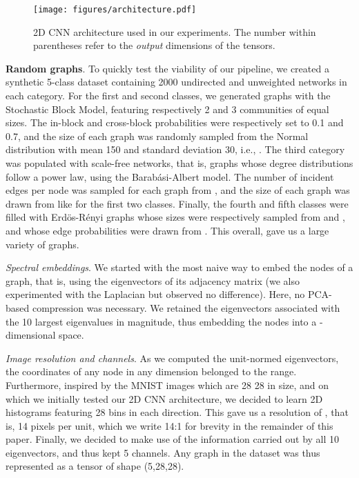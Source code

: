 \documentclass[runningheads]{llncs}
\begin{document}
\vspace{-0.4cm}

\begin{figure}[h]
  \centering
    \texttt{[image: figures/architecture.pdf]}
\captionsetup{justification=justified,singlelinecheck=false, size=small}
    \caption{2D CNN architecture used in our experiments. The number within parentheses refer to the \textit{output} dimensions of the tensors. }
\label{fig:arch}
\end{figure}

\vspace{-0.6cm}

\noindent \textbf{Random graphs}.
To quickly test the viability of our pipeline, we created a synthetic 5-class dataset containing 2000 undirected and unweighted networks in each category. For the first and second classes, we generated graphs with the Stochastic Block Model, featuring respectively 2 and 3 communities of equal sizes. The in-block and cross-block probabilities were respectively set to 0.1 and 0.7, and the size  of each graph was randomly sampled from the Normal distribution with mean 150 and standard deviation 30, i.e., . The third category was populated with scale-free networks, that is, graphs whose degree distributions follow a power law, using the Barab{\'a}si-Albert model. The number of incident edges per node was sampled for each graph from , and the size of each graph was drawn from  like for the first two classes. Finally, the fourth and fifth classes were filled with Erd{\"o}s-R{\'e}nyi graphs whose sizes were respectively sampled from  and , and whose edge probabilities were drawn from . This overall, gave us a large variety of graphs.

\textit{Spectral embeddings}. We started with the most naive way to embed the nodes of a graph, that is, using the eigenvectors of its adjacency matrix (we also experimented with the Laplacian but observed no difference). Here, no PCA-based compression was necessary. We retained the eigenvectors associated with the 10 largest eigenvalues in magnitude, thus embedding the nodes into a -dimensional space.

\textit{Image resolution and channels}. As we computed the unit-normed eigenvectors, the coordinates of any node in any dimension belonged to the  range. Furthermore, inspired by the MNIST images which are 28  28 in size, and on which we initially tested our 2D CNN architecture, we decided to learn 2D histograms featuring 28 bins in each direction. This gave us a resolution of , that is, 14 pixels per unit, which we write 14:1 for brevity in the remainder of this paper. Finally, we decided to make use of the information carried out by all 10 eigenvectors, and thus kept 5 channels. Any graph in the dataset was thus represented as a tensor of shape (5,28,28).
\end{document}
